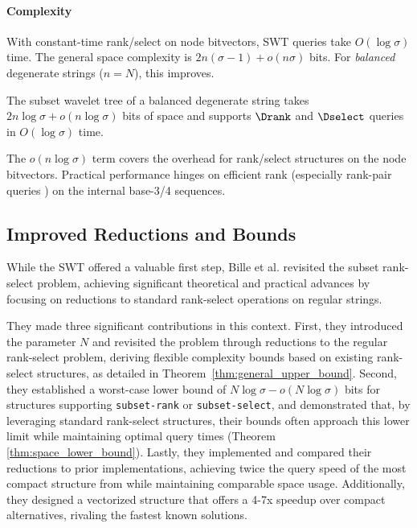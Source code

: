 \paragraph{Complexity} With constant-time rank/select on node bitvectors, SWT queries take $O(\log \sigma)$ time. The general space complexity is $2n(\sigma - 1) + o(n\sigma)$ bits. For \emph{balanced} degenerate strings ($n=N$), this improves.

\begin{theorem} \label{thm:swt_space_balanced_combined_alt}
    The subset wavelet tree of a balanced degenerate string takes $2n \log \sigma + o(n \log \sigma)$ bits of space and supports $\Drank$ and $\Dselect$ queries in $O(\log \sigma)$ time.
\end{theorem}
The $o(n \log \sigma)$ term covers the overhead for rank/select structures on the node bitvectors. Practical performance hinges on efficient rank (especially rank-pair queries \cite{SubsetWT}) on the internal base-3/4 sequences.


\subsection{Improved Reductions and Bounds}
\label{sec:degenerate_string_better_combined_alt}

While the SWT offered a valuable first step, Bille et al. \cite{bille2023rank} revisited the subset rank-select problem, achieving significant theoretical and practical advances by focusing on reductions to standard rank-select operations on regular strings.

\noindent They made three significant contributions in this context. First, they introduced the parameter $N$ and revisited the problem through reductions to the regular rank-select problem, deriving flexible complexity bounds based on existing rank-select structures, as detailed in Theorem~\ref{thm:general_upper_bound}. Second, they established a worst-case lower bound of $N\log \sigma - o(N\log \sigma)$ bits for structures supporting \texttt{subset-rank} or \texttt{subset-select}, and demonstrated that, by leveraging standard rank-select structures, their bounds often approach this lower limit while maintaining optimal query times (Theorem \ref{thm:space_lower_bound}). Lastly, they implemented and compared their reductions to prior implementations, achieving twice the query speed of the most compact structure from \cite{SubsetWT} while maintaining comparable space usage. Additionally, they designed a vectorized structure that offers a 4-7x speedup over compact alternatives, rivaling the fastest known solutions.

